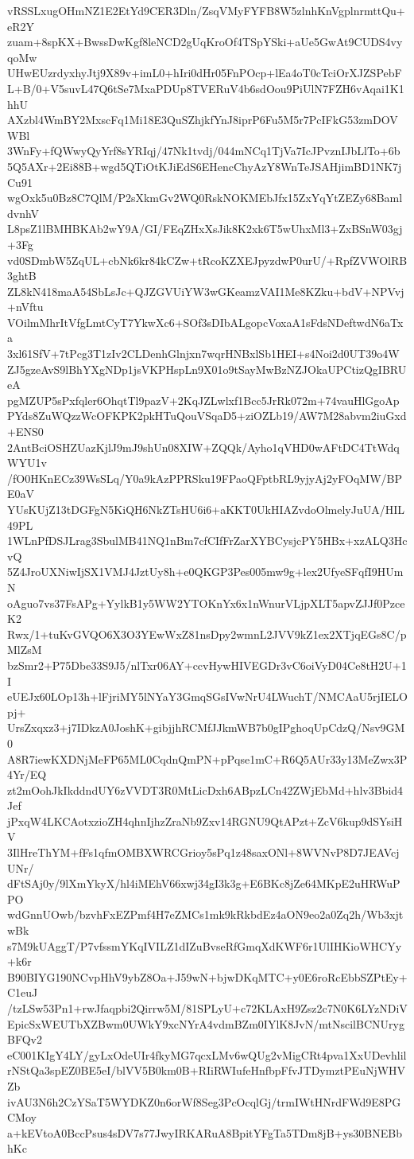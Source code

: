 vRSSLxugOHmNZ1E2EtYd9CER3Dln/ZsqVMyFYFB8W5zlnhKnVgplnrmttQu+eR2Y
zuam+8spKX+BwssDwKgf8leNCD2gUqKroOf4TSpYSki+aUe5GwAt9CUDS4vyqoMw
UHwEUzrdyxhyJtj9X89v+imL0+hIri0dHr05FnPOcp+lEa4oT0cTciOrXJZSPebF
L+B/0+V5suvL47Q6tSe7MxaPDUp8TVERuV4b6sdOou9PiUlN7FZH6vAqai1K1hhU
AXzbl4WmBY2MxscFq1Mi18E3QuSZhjkfYnJ8iprP6Fu5M5r7PcIFkG53zmDOVWBl
3WnFy+fQWwyQyYrf8sYRIqj/47Nk1tvdj/044mNCq1TjVa7IcJPvznIJbLlTo+6b
5Q5AXr+2Ei88B+wgd5QTiOtKJiEdS6EHencChyAzY8WnTeJSAHjimBD1NK7jCu91
wgOxk5u0Bz8C7QlM/P2sXkmGv2WQ0RskNOKMEbJfx15ZxYqYtZEZy68BamldvnhV
L8psZ1lBMHBKAb2wY9A/GI/FEqZHxXsJik8K2xk6T5wUhxMl3+ZxBSnW03gj+3Fg
vd0SDmbW5ZqUL+cbNk6kr84kCZw+tRcoKZXEJpyzdwP0urU/+RpfZVWOlRB3ghtB
ZL8kN418maA54SbLsJc+QJZGVUiYW3wGKeamzVAI1Me8KZku+bdV+NPVvj+nVftu
VOilmMhrItVfgLmtCyT7YkwXc6+SOf3sDIbALgopcVoxaA1sFdsNDeftwdN6aTxa
3xl61SfV+7tPcg3T1zIv2CLDenhGlnjxn7wqrHNBxlSb1HEI+s4Noi2d0UT39o4W
ZJ5gzeAvS9lBhYXgNDp1jsVKPHspLn9X01o9tSayMwBzNZJOkaUPCtizQgIBRUeA
pgMZUP5sPxfqler6OhqtTl9pazV+2KqJZLwlxf1Bcc5JrRk072m+74vauHlGgoAp
PYds8ZuWQzzWcOFKPK2pkHTuQouVSqaD5+ziOZLb19/AW7M28abvm2iuGxd+ENS0
2AntBciOSHZUazKjlJ9mJ9shUn08XIW+ZQQk/Ayho1qVHD0wAFtDC4TtWdqWYU1v
/fO0HKnECz39WsSLq/Y0a9kAzPPRSku19FPaoQFptbRL9yjyAj2yFOqMW/BPE0aV
YUsKUjZ13tDGFgN5KiQH6NkZTsHU6i6+aKKT0UkHIAZvdoOlmelyJuUA/HIL49PL
1WLnPfDSJLrag3SbulMB41NQ1nBm7cfCIfFrZarXYBCysjcPY5HBx+xzALQ3HcvQ
5Z4JroUXNiwIjSX1VMJ4JztUy8h+e0QKGP3Pes005mw9g+lex2UfyeSFqfI9HUmN
oAguo7vs37FsAPg+YylkB1y5WW2YTOKnYx6x1nWnurVLjpXLT5apvZJJf0PzceK2
Rwx/1+tuKvGVQO6X3O3YEwWxZ81nsDpy2wmnL2JVV9kZ1ex2XTjqEGs8C/pMlZsM
bzSmr2+P75Dbe33S9J5/nlTxr06AY+ccvHywHIVEGDr3vC6oiVyD04Ce8tH2U+1I
eUEJx60LOp13h+lFjriMY5lNYaY3GmqSGsIVwNrU4LWuchT/NMCAaU5rjIELOpj+
UrsZxqxz3+j7IDkzA0JoshK+gibjjhRCMfJJkmWB7b0gIPghoqUpCdzQ/Nsv9GM0
A8R7iewKXDNjMeFP65ML0CqdnQmPN+pPqse1mC+R6Q5AUr33y13MeZwx3P4Yr/EQ
zt2mOohJkIkddndUY6zVVDT3R0MtLicDxh6ABpzLCn42ZWjEbMd+hlv3Bbid4Jef
jPxqW4LKCAotxzioZH4qhnIjhzZraNb9Zxv14RGNU9QtAPzt+ZcV6kup9dSYsiHV
3IlHreThYM+fFs1qfmOMBXWRCGrioy5sPq1z48saxONl+8WVNvP8D7JEAVcjUNr/
dFtSAj0y/9lXmYkyX/hl4iMEhV66xwj34gI3k3g+E6BKc8jZe64MKpE2uHRWuPPO
wdGnnUOwb/bzvhFxEZPmf4H7eZMCs1mk9kRkbdEz4aON9eo2a0Zq2h/Wb3xjtwBk
s7M9kUAggT/P7vfssmYKqIVILZ1dIZuBvseRfGmqXdKWF6r1UlIHKioWHCYy+k6r
B90BIYG190NCvpHhV9ybZ8Oa+J59wN+bjwDKqMTC+y0E6roRcEbbSZPtEy+C1euJ
/tzLSw53Pn1+rwJfaqpbi2Qirrw5M/81SPLyU+c72KLAxH9Zsz2c7N0K6LYzNDiV
EpicSxWEUTbXZBwm0UWkY9xcNYrA4vdmBZm0IYlK8JvN/mtNscilBCNUrygBFQv2
eC001KIgY4LY/gyLxOdeUIr4fkyMG7qcxLMv6wQUg2vMigCRt4pva1XxUDevhlil
rNStQa3spEZ0BE5eI/blVV5B0km0B+RIiRWIufeHnfbpFfvJTDymztPEuNjWHVZb
ivAU3N6h2CzYSaT5WYDKZ0n6orWf8Seg3PcOcqlGj/trmIWtHNrdFWd9E8PGCMoy
a+kEVtoA0BccPsus4sDV7s77JwyIRKARuA8BpitYFgTa5TDm8jB+ys30BNEBbhKc

